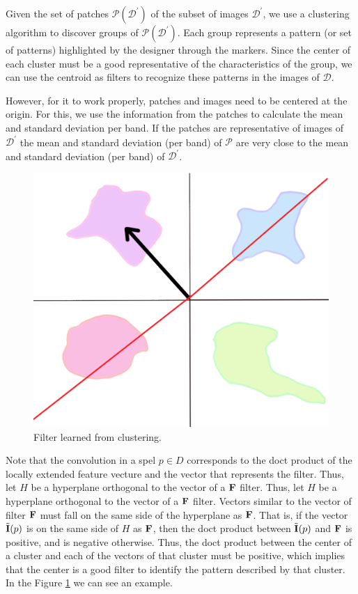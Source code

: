\documentclass[10pt,twocolumn,letterpaper]{article}
\newcommand{\D}{\mathcal{D}}
\newcommand{\m}[1]{{\mathrm{\bf #1}}}
\newcommand{\E}{\tilde{\m{I}}}
\newcommand{\mF}{\m{F}}
\newcommand{\Pa}{\mathcal{P}}
\newcommand{\pDD}{\D^\prime}
\begin{document}
Given the set of patches $\Pa(\pDD)$ of the subset of images $\pDD$, we use a clustering algorithm to discover groups of $\Pa(\pDD)$. Each group represents a pattern (or set of patterns) highlighted by the designer through the markers. Since the center of each cluster must be a good representative of the characteristics of the group, we can use the centroid as filters to recognize these patterns in the images of $\D$.

However, for it to work properly, patches and images need to be centered at the origin. For this, we use the information from the patches to calculate the mean and standard deviation per band. If the patches are representative of images of $\pDD$ the mean and standard deviation (per band) of $\Pa$ are very close to the mean and standard deviation (per band) of $\pDD$.

\begin{figure}[t]
  \begin{center}
     \includegraphics[width=0.8\linewidth]{figures/filter.png}
  \end{center}
     \caption{Filter learned from clustering.}
  \label{fig:filter}
\end{figure}

Note that the convolution in a spel $p \in D$ corresponds to the doct product of the locally extended feature vecture and the vector that represents the filter. Thus, let $H$ be a hyperplane orthogonal to the vector of a $\mF$ filter. Thus, let $ H $ be a hyperplane orthogonal to the vector of a $ \mF$ filter. Vectors similar to the vector of filter $\mF$ must fall on the same side of the hyperplane as $\mF$. That is, if the vector $\E(p)$ is on the same side of $H$ as $\mF$, then the doct product between $\E (p)$ and $\mF$ is positive, and is negative otherwise. Thus, the doct product between the center of a cluster and each of the vectors of that cluster must be positive, which implies that the center is a good filter to identify the pattern described by that cluster. In the Figure \ref{fig:filter} we can see an example.
\end{document}
